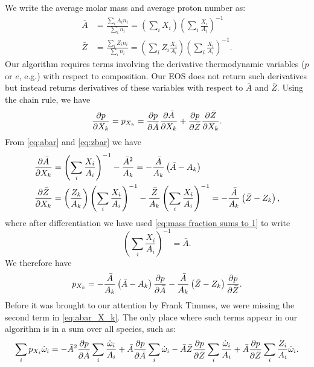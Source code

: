 We write the average molar mass and average proton number as:
\begin{align}\label{eq:abar}
  \bar{A} &= \frac{\sum_i A_i n_i}{\sum_i n_i} = \left(\sum_i X_i\right)
  \left(\sum_i \frac{X_i}{A_i}\right)^{-1}\\
  \label{eq:zbar}
  \bar{Z} &= \frac{\sum_i Z_i n_i}{\sum_i n_i} = \left(\sum_i Z_i
  \frac{X_i}{A_i}\right)\left(\sum_i \frac{X_i}{A_i}\right)^{-1}.
\end{align}
Our algorithm requires terms involving the derivative thermodynamic variables
($p$ or $e$, e.g.) with respect to composition.  Our EOS does not return such
derivatives but instead returns derivatives of these variables with respect 
to $\bar{A}$ and $\bar{Z}$.  Using the chain rule, we have
\begin{equation}\label{eq:p_xk}
  \frac{\partial p}{\partial X_k} = p_{X_k} = 
  \frac{\partial p}{\partial \bar{A}}\frac{\partial \bar{A}}{\partial X_k} + 
  \frac{\partial p}{\partial \bar{Z}}\frac{\partial \bar{Z}}{\partial X_k}.
\end{equation}
From \eqref{eq:abar} and \eqref{eq:zbar} we have
\begin{align}\label{eq:abar_X_k}
  \frac{\partial \bar{A}}{\partial X_k} &= \left(\sum_i \frac{X_i}{A_i}\right)^{-1}
  - \frac{\bar{A}^2}{A_k} = -\frac{\bar{A}}{A_k}\left(\bar{A} - A_k\right)\\
  \label{eq:zbar_X_k}
  \frac{\partial \bar{Z}}{\partial X_k} &= 
  \left(\frac{Z_k}{A_k}\right)\left(\sum_i \frac{X_i}{A_i}\right)^{-1}
  - \frac{\bar{Z}}{A_k}\left(\sum_i \frac{X_i}{A_i}\right)^{-1} = 
  -\frac{\bar{A}}{A_k}\left(\bar{Z} - Z_k\right),
\end{align}
where after differentiation we have used \eqref{eq:mass fraction sums to 1}
to write
\[
\left(\sum_i \frac{X_i}{A_i}\right)^{-1} = \bar{A}.
\]
We therefore have
\begin{equation}\label{eq:p_Xk_full}
  p_{X_k} = -\frac{\bar{A}}{A_k}\left(\bar{A} - A_k\right)
  \frac{\partial p}{\partial\bar{A}} - \frac{\bar{A}}{A_k}\left(\bar{Z} - Z_k\right)
  \frac{\partial p}{\partial\bar{Z}}.
\end{equation}
Before it was brought to our attention by Frank Timmes, we were missing the
second term in \eqref{eq:abar_X_k}.  The only place where such terms 
appear in our algorithm is in a sum over all species, such as:
\begin{equation}\label{eq:sum over species}
  \sum_i p_{X_i}\dot{\omega}_i = 
  -\bar{A}^2\frac{\partial p}{\partial\bar{A}}\sum_i \frac{\dot{\omega}_i}{A_i}
  +\bar{A}\frac{\partial p}{\partial\bar{A}}\sum_i \dot{\omega}_i
  -\bar{A}\bar{Z}\frac{\partial p}{\partial\bar{Z}}\sum_i \frac{\dot{\omega}_i}{A_i}
  +\bar{A}\frac{\partial p}{\partial \bar{Z}}\sum_i\frac{Z_i}{A_i}\dot{\omega}_i.
\end{equation}
